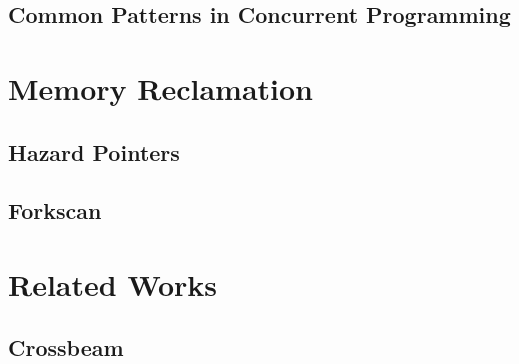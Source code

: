 \subsection{Common Patterns in Concurrent Programming\label{sec:common-patterns}}
\blindtext{}


\section{Memory Reclamation}
\blindtext{}

\subsection{Hazard Pointers\label{sec:hazard-pointers}}
\blindtext{}

\subsection{Forkscan\label{sec:forkscan}}
\blindtext{}


\section{Related Works}
\blindtext{}

\subsection{Crossbeam}
\blindtext{}
